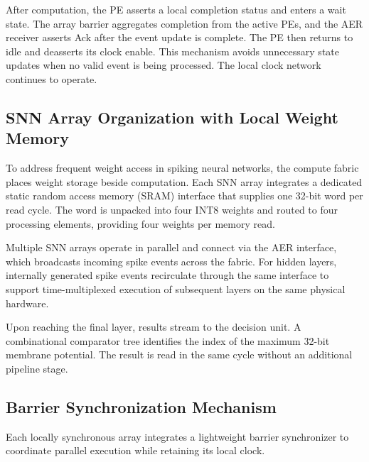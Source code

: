 \documentclass[12pt]{article}
\providecommand{\DIFaddtex}[1]{{\protect\color{blue}\sf #1}}
\providecommand{\DIFadd}[1]{\texorpdfstring{\DIFaddtex{#1}}{#1}}
\providecommand{\DIFaddbegin}{}
\providecommand{\DIFaddend}{}
\begin{document}
After computation, the PE  \DIFaddbegin \DIFadd{asserts a local completion status }\DIFaddend and enters a wait state.  \DIFaddbegin \DIFadd{The array barrier aggregates completion from the active PEs, and the AER receiver asserts Ack after the event update is complete. The PE then returns to idle and deasserts its clock enable. This mechanism avoids unnecessary state updates when no valid event is being processed. The local clock network continues to operate}\DIFaddend .


\subsection{ SNN Array Organization \DIFaddbegin \DIFadd{with Local Weight Memory}\DIFaddend }

To address  \DIFaddbegin \DIFadd{frequent weight access }\DIFaddend in spiking neural networks, the compute fabric  \DIFaddbegin \DIFadd{places weight storage beside }\DIFaddend computation. Each SNN array integrates a dedicated  \DIFaddbegin \DIFadd{static random access memory (SRAM) }\DIFaddend interface that supplies  \DIFaddbegin \DIFadd{one }\DIFaddend 32-bit  word per read cycle.  \DIFaddbegin \DIFadd{The }\DIFaddend word is unpacked into four INT8 weights and routed to four processing elements\DIFaddbegin \DIFadd{, providing four weights per memory read}\DIFaddend .

Multiple SNN arrays operate in parallel and connect via the AER interface, which broadcasts incoming spike events across the fabric. For hidden layers, internally generated spike events recirculate through the same interface to support time-multiplexed execution of subsequent layers on the same physical hardware.

Upon reaching the final layer, results stream to the decision unit.  \DIFaddbegin \DIFadd{A }\DIFaddend combinational comparator tree  \DIFaddbegin \DIFadd{identifies }\DIFaddend the index of the maximum  32-bit membrane potential\DIFaddbegin \DIFadd{. The result is read }\DIFaddend in the same cycle without an additional pipeline stage.

\subsection{Barrier Synchronization Mechanism}

 \DIFaddbegin \DIFadd{Each locally synchronous }\DIFaddend array integrates a lightweight barrier synchronizer \DIFaddbegin \DIFadd{to coordinate parallel execution while retaining its local clock}\DIFaddend .
\end{document}
